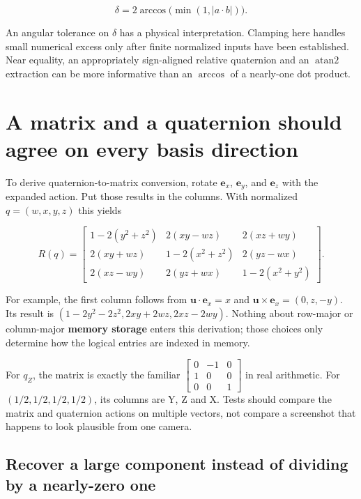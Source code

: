\[
\delta=2\arccos\bigl(\min(1,|a\cdot b|)\bigr).
\]

An angular tolerance on \(\delta\) has a physical interpretation. Clamping here handles small numerical excess only after finite normalized inputs have been established. Near equality, an appropriately sign-aligned relative quaternion and an \(\operatorname{atan2}\) extraction can be more informative than an \(\arccos\) of a nearly-one dot product.

\section{A matrix and a quaternion should agree on every basis direction}\label{01-foundations-i-ch019-a-matrix-and-a-quaternion-should-agree-on-every-basis-direction}

\hypertarget{01-foundations-i-ch019-a-matrix-and-a-quaternion-should-agree-on-every-basis-direction}{}

To derive quaternion-to-matrix conversion, rotate \(\mathbf e_x\), \(\mathbf e_y\), and \(\mathbf e_z\) with the expanded action. Put those results in the columns. With normalized \(q=(w,x,y,z)\) this yields

\[
R(q)=\begin{bmatrix}
1-2(y^2+z^2)&2(xy-wz)&2(xz+wy)\\
2(xy+wz)&1-2(x^2+z^2)&2(yz-wx)\\
2(xz-wy)&2(yz+wx)&1-2(x^2+y^2)
\end{bmatrix}.
\]

For example, the first column follows from \(\mathbf u\cdot\mathbf e_x=x\) and \(\mathbf u\times\mathbf e_x=(0,z,-y)\). Its result is \((1-2y^2-2z^2,2xy+2wz,2xz-2wy)\). Nothing about row-major or column-major \textbf{memory storage} enters this derivation; those choices only determine how the logical entries are indexed in memory.

For \(q_Z\), the matrix is exactly the familiar \(\begin{bmatrix}0&-1&0\\1&0&0\\0&0&1\end{bmatrix}\) in real arithmetic. For \((1/2,1/2,1/2,1/2)\), its columns are Y, Z and X. Tests should compare the matrix and quaternion actions on multiple vectors, not compare a screenshot that happens to look plausible from one camera.

\subsection{Recover a large component instead of dividing by a nearly-zero one}\label{01-foundations-i-ch019-recover-a-large-component-instead-of-dividing-by-a-nearly-zero-one}

